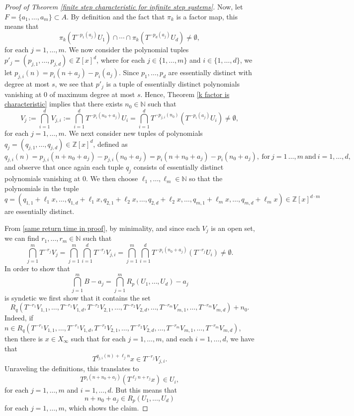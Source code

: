 \documentclass[reqno]{amsart}
\def\Z{{\mathbb Z}}
\def\N{{\mathbb N}}
\theoremstyle{definition}
\theoremstyle{remark}
\def\N{{\mathbb N}}
\begin{document}
\begin{proof}[Proof of Theorem \ref{finite step characteristic for infinite step systems}]
Now, let $F=\{a_1,\ldots,a_m\}\subset A$. By definition and 
the fact that $\pi_k$ is a factor map, this means that 
$$\pi_k (T^{-p_1(a_j)}U_1) \cap \cdots \cap \pi_k(T^{-p_d(a_j)}U_d) \neq \emptyset,$$
for each $j=1,\ldots,m.$
We now consider the polynomial tuples $p'_j=(p_{j,1},\ldots,p_{j,d}) \in \Z[x]^d$, where for each $j\in \{1,\ldots,m\}$ and $i\in \{1,\ldots,d\}$, we let $p_{j,i}(n)=p_i(n+a_j)-p_i(a_j)$. Since $p_1,\ldots,p_d$ are essentially distinct with degree at most $s$, we see that $p'_j$ is a tuple of essentially distinct polynomials vanishing at $0$ of maximum degree at most $s$. Hence, Theorem \ref{k factor is characteristic} implies that there exists $n_0\in \N$ such that 
\begin{equation}\label{same return time in proof}
 V_{j}:= \bigcap_{i=1}^d V_{j,i}:=\bigcap_{i=1}^d T^{-p_i(n_0+a_j)}U_i=\bigcap_{i=1}^d T^{-p_{j,i}(n_0)}(T^{-p_i(a_j)}U_i) \neq \emptyset,    
\end{equation}
for each $j=1,\ldots,m$. We next consider new tuples of polynomials $q_j=(q_{j,1},\ldots,q_{j,d})\in \Z[x]^d$, defined as 
$$q_{j,i}(n)=p_{j,i}(n+n_0+a_j)-p_{j,i}(n_0+a_j)=p_i(n+n_0+a_j)-p_i(n_0+a_j),\ \text{for}\ j=1\,\ldots,m\ \text{and}\ i=1,\ldots,d,$$
and observe that 
once again each tuple $q_j$ consists of essentially distinct 
polynomials vanishing at $0$. We then choose $\ell_1,\ldots,\ell_m\in \N$ so that the polynomials in the tuple
$$q=(q_{1,1}+\ell_1x,\ldots,q_{1,d}+\ell_1x, q_{2,1}+\ell_2x,\ldots,q_{2,d}+\ell_2x,\ldots,q_{m,1}+\ell_mx,\ldots,q_{m,d}+\ell_mx)\in \Z[x]^{d\cdot m} $$
are essentially distinct. 

From \eqref{same return time in proof}, by minimality, and 
since each $V_{j}$ is an open set, we can find $r_1,\ldots,r_m\in \N$ such that  
$$\bigcap_{j=1}^m T^{-r_j}V_j= \bigcap_{j=1}^m \bigcap_{i=1}^d T^{-r_j}V_{j,i}=\bigcap_{j=1}^m \bigcap_{i=1}^d T^{-p_i(n_0+a_j)}(T^{-r_j}U_i) \neq \emptyset.$$
In order to show that 
$$\bigcap_{j=1}^m B-a_j=\bigcap_{j=1}^m R_p(U_1,\ldots,U_d)-a_j$$
is syndetic we first show that it contains the set
$$R_q (T^{-r_1}V_{1,1},\ldots,T^{-r_1}V_{1,d},T^{-r_2}V_{2,1},\ldots,T^{-r_2}V_{2,d},\ldots,T^{-r_m}V_{m,1},\ldots,T^{-r_m}V_{m,d})+n_0.$$
Indeed, if $n\in R_q (T^{-r_1}V_{1,1},\ldots,T^{-r_1}V_{1,d},T^{-r_2}V_{2,1},\ldots,T^{-r_2}V_{2,d},\ldots,T^{-r_m}V_{m,1},\ldots,T^{-r_m}V_{m,d})$, then there is $x\in X_{\infty}$ such that for each $j=1,\ldots,m$, and each $i=1,\ldots,d$, we have that 
$$T^{q_{j,i}(n)+\ell_jn}x\in T^{-r_j}V_{j,i}.$$
Unraveling the definitions, this translates to 
$$T^{p_i(n+n_0+a_j)}(T^{\ell_jn+r_j}x)\in U_i,$$
for each $j=1,\ldots,m$ and $i=1,\ldots,d$. But this means that $$n+n_0+a_j\in R_{p}(U_1,\ldots,U_d)$$
for each $j=1,\ldots,m$, which shows the claim.


\end{proof}
\end{document}

